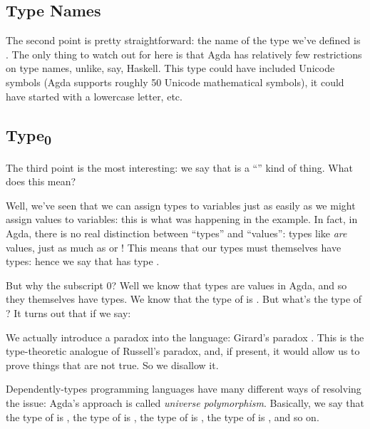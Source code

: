 \subsection{Type Names}
The second point is pretty straightforward: the name of the type we've defined
is .
The only thing to watch out for here is that Agda has relatively few
restrictions on type names, unlike, say, Haskell.
This type could have included Unicode symbols (Agda supports roughly 50 Unicode
mathematical symbols), it could have started with a lowercase letter, etc.

\subsection{Type\textsubscript{0}}
The third point is the most interesting: we say that  is a
``'' kind of thing.
What does this mean?

Well, we've seen that we can assign types to variables just as easily as we
might assign values to variables: this is what was happening in the
 example.
In fact, in Agda, there is no real distinction between ``types'' and ``values'':
types like  \emph{are} values, just as much as
 or !
This means that our types must themselves have types: hence we say that
 has type .

But why the subscript 0?
Well we know that types are values in Agda, and so they themselves have types.
We know that the type of  is
.
But what's the type of ?
It turns out that if we say:
We actually introduce a paradox into the language: Girard's paradox
\citep{girardInterpretationFonctionelleElimination1972}.
This is the type-theoretic analogue of Russell's paradox, and, if present, it
would allow us to prove things that are not true.
So we disallow it.

Dependently-types programming languages have many different ways of resolving
the issue: Agda's approach is called \emph{universe polymorphism}.
Basically, we say that the type of  is
, the type of  is
, the type of 
is , the type of 
is , and so on.

